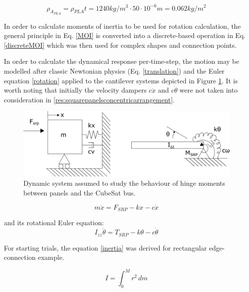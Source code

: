 \begin{equation}
\rho_{A_{PLA}} = \rho_{PLA} t = 1240 kg/m^3 \cdot 50 \cdot 10^{-6} m = 0.062 kg/m^2 \label{density}
\end{equation}

In order to calculate moments of inertia to be used for rotation calculation, the general principle in Eq. \ref{MOI} is converted into a discrete-based operation in Eq. \ref{discreteMOI} which was then used for complex shapes and connection points.

In order to calculate the dynamical response per-time-step, the motion may be modelled after classic Newtonian physics (Eq. \ref{translation}) and the Euler equation \ref{rotation} applied to the cantilever systems depicted in Figure \ref{springSys}. It is worth noting that initially the velocity dampers $c\dot{x}$ and $c\dot{\theta}$ were not taken into consideration in \ref{res:squarepanelsconcentricarrangement}.

\begin{center}
\begin{figure}[!htb]
    \centering
\includegraphics[width=0.7\linewidth]{images/spring damp system.png} 
\caption{Dynamic system assumed to study the behaviour of hinge moments between panels and the CubeSat bus.}
  \normalsize
  \label{springSys}
\end{figure}
\end{center}


\begin{equation}
    m\ddot{x} = F_{SRP} - kx - c\dot{x}
    \label{translation}
\end{equation}


and its rotational Euler equation:
\begin{equation}
    I_{zz} \ddot{\theta} = T_{SRP} - k\theta - c\dot{\theta}
    \label{rotation}
\end{equation}



For starting trials, the equation \ref{inertia} was derived for rectangular edge-connection example.

\begin{equation}
    I = \int_{0}^{M} r^2  \,dm
    \label{MOI}
\end{equation}

